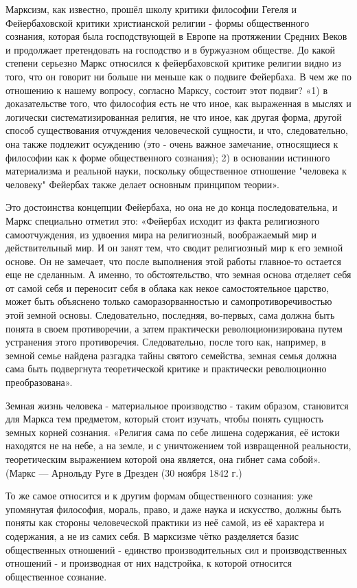 \documentclass[../main]{subfiles}
\begin{document}
Марксизм, как известно, прошёл школу критики философии Гегеля и Фейербаховской критики христианской религии - формы общественного сознания, которая была господствующей в Европе на протяжении Средних Веков и продолжает претендовать на господство и в буржуазном обществе. До какой степени серьезно Маркс относился к фейербаховской критике религии видно из того, что он говорит ни больше ни меньше как о подвиге Фейербаха. В чем же по отношению к нашему вопросу, согласно Марксу, состоит этот подвиг? «1) в доказательстве того, что философия есть не что иное, как выраженная в мыслях и логически систематизированная религия, не что иное, как другая форма, другой способ существования отчуждения человеческой сущности, и что, следовательно, она также подлежит осуждению (это - очень важное замечание, относящиеся к философии как к форме общественного сознания); 2) в основании истинного материализма и реальной науки, поскольку общественное отношение "человека к человеку" Фейербах также делает основным принципом теории».

Это достоинства концепции Фейербаха, но она не до конца последовательна, и Маркс специально отметил это: «Фейербах исходит из факта религиозного самоотчуждения, из удвоения мира на религиозный, воображаемый мир и действительный мир. И он занят тем, что сводит религиозный мир к его земной основе. Он не замечает, что после выполнения этой работы главное-то остается еще не сделанным. А именно, то обстоятельство, что земная основа отделяет себя от самой себя и переносит себя в облака как некое самостоятельное царство, может быть объяснено только саморазорванностью и самопротиворечивостью этой земной основы. Следовательно, последняя, во-первых, сама должна быть понята в своем противоречии, а затем практически революционизирована путем устранения этого противоречия. Следовательно, после того как, например, в земной семье найдена разгадка тайны святого семейства, земная семья должна сама быть подвергнута теоретической критике и практически революционно преобразована».

Земная жизнь человека - материальное производство - таким образом, становится для Маркса тем предметом, который стоит изучать, чтобы понять сущность земных корней сознания. «Религия сама по себе лишена содержания, её истоки находятся не на небе, а на земле, и с уничтожением той извращенной реальности, теоретическим выражением которой она является, она гибнет сама собой». (Маркс — Арнольду Руге в Дрезден (30 ноября 1842 г.)

То же самое относится и к другим формам общественного сознания: уже упомянутая философия, мораль, право, и даже наука и искусство, должны быть поняты как стороны человеческой практики из неё самой, из её характера и содержания, а не из самих себя. В марксизме чётко разделяется базис общественных отношений - единство производительных сил и производственных отношений - и производная от них надстройка, к которой относится общественное сознание.
\end{document}
